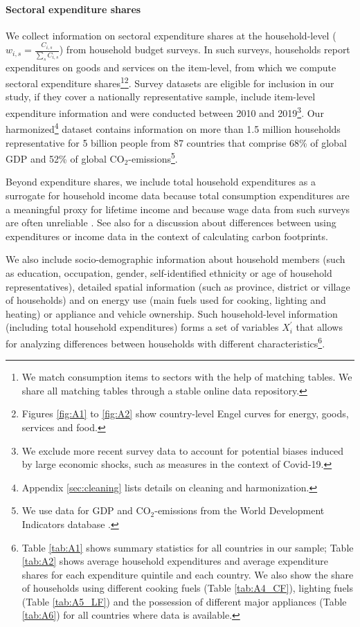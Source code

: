 \documentclass[12pt, a4paper]{article}
\begin{document}
\paragraph{Sectoral expenditure shares} We collect information on sectoral expenditure shares at the household-level ($w_{i,s}=\frac{C_{i,s}}{\sum_{s}C_{i,s}}$) from household budget surveys. In such surveys, households report expenditures on goods and services on the item-level, from which we compute sectoral expenditure shares\footnote{We match consumption items to sectors with the help of matching tables. We share all matching tables through a stable online data repository.}\footnote{Figures \ref{fig:A1} to \ref{fig:A2} show country-level Engel curves for energy, goods, services and food.}.
Survey datasets are eligible for inclusion in our study, if they cover a nationally representative sample, include item-level expenditure information and were conducted between 2010 and 2019\footnote{We exclude more recent survey data to account for potential biases induced by large economic shocks, such as measures in the context of Covid-19.}. Our harmonized\footnote{Appendix \ref{sec:cleaning} lists details on cleaning and harmonization.} dataset contains information on more than 1.5 million households representative for 5 billion people from 87 countries that comprise 68\% of global GDP and 52\% of global CO$_{2}$-emissions\footnote{We use data for GDP and CO$_{2}$-emissions from the World Development Indicators database \autocite{WorldBankGroup.2023}.}.

Beyond expenditure shares, we include total household expenditures as a surrogate for household income data because total consumption expenditures are a meaningful proxy for lifetime income \autocite{Poterba.1989,JamesM.Poterba.2016,Cronin.2019} and because wage data from such surveys are often unreliable \autocite{Blundell.1998}. See also \textcite{Levay.2023} for a discussion about differences between using expenditures or income data in the context of calculating carbon footprints.

We also include socio-demographic information about household members (such as education, occupation, gender, self-identified ethnicity or age of household representatives), detailed spatial information (such as province, district or village of households) and on energy use (main fuels used for cooking, lighting and heating) or appliance and vehicle ownership. Such household-level information (including total household expenditures) forms a set of variables $X_{i}^{'}$ that allows for analyzing differences between households with different characteristics\footnote{Table \ref{tab:A1} shows summary statistics for all countries in our sample; Table \ref{tab:A2} shows average household expenditures and average expenditure shares for each expenditure quintile and each country. We also show the share of households using different cooking fuels (Table \ref{tab:A4_CF}), lighting fuels (Table \ref{tab:A5_LF}) and the possession of different major appliances (Table \ref{tab:A6}) for all countries where data is available.}. 
\end{document}
